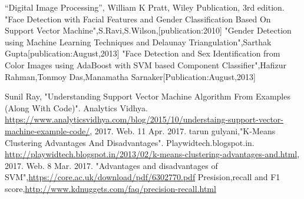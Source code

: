 \documentclass[journal]{IEEEtran}
\begin{document}
	
	\begin{thebibliography}{1}
		“Digital Image Processing”, William K Pratt, Wiley
		Publication, 3rd edition.
		"Face Detection with Facial Features and Gender Classification Based On
		Support Vector Machine",S.Ravi,S.Wilson,[publication:2010]
		"Gender Detection using Machine Learning Techniques
		and Delaunay Triangulation",Sarthak Gupta[publication:August,2013]
		"Face Detection and Sex Identification from Color Images
		using AdaBoost with SVM based Component Classifier",Hafizur Rahman,Tonmoy Das,Manamatha Sarnaker[Publication:August,2013]
		
		Sunil Ray, "Understanding Support Vector Machine Algorithm From Examples (Along With Code)". Analytics Vidhya. \url{https://www.analyticsvidhya.com/blog/2015/10/understaing-support-vector-machine-example-code/}, 2017. Web. 11 Apr. 2017.
		tarun gulyani,"K-Means Clustering Advantages And Disadvantages". Playwidtech.blogspot.in. \url{http://playwidtech.blogspot.in/2013/02/k-means-clustering-advantages-and.html}, 2017. Web. 8 Mar. 2017.
		"Advantages and disadvantages of SVM",\url{https://core.ac.uk/download/pdf/6302770.pdf}
		Presision,recall and F1 score,\url{http://www.kdnuggets.com/faq/precision-recall.html}
		
	\end{thebibliography}
	
	
	
\end{document}
